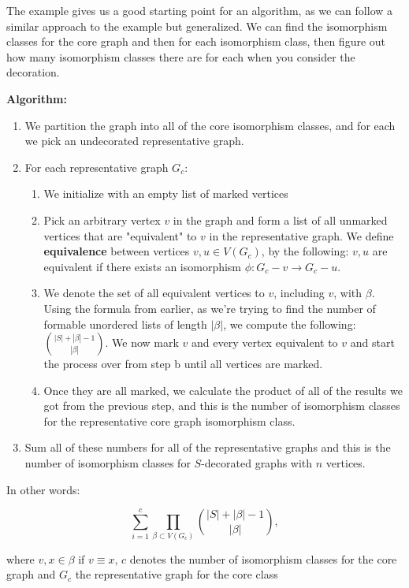\documentclass[11pt,reqno]{amsart}
\theoremstyle{definition}
\begin{document}
The example gives us a good starting point for an algorithm, as we can follow a similar approach to the example but generalized. We can find the isomorphism classes for the core graph and then for each isomorphism class, then figure out how many isomorphism classes there are for each when you consider the decoration.

\textbf{Algorithm:}
\begin{enumerate}
    \item We partition the graph into all of the core isomorphism classes, and for each we pick an undecorated representative graph.
    \item For each representative graph $G_c$:
    \begin{enumerate}
        \item We initialize with an empty list of marked vertices
        \item Pick an arbitrary vertex $v$ in the graph and form a list of all unmarked vertices that are "equivalent" to $v$ in the representative graph. We define \textbf{equivalence} between vertices $v, u \in V(G_c)$, by the following: $v, u$ are equivalent if there exists an isomorphism $\phi: G_c - v \rightarrow G_c - u$. 
        \item We denote the set of all equivalent vertices to $v$, including $v$, with $\beta$. Using the formula from earlier, as we're trying to find the number of formable unordered lists of length $|\beta|$, we compute the following: $\binom{|S| + |\beta| - 1}{|\beta|}$. We now mark $v$ and every vertex equivalent to $v$ and start the process over from step b until all vertices are marked.
        \item Once they are all marked, we calculate the product of all of the results we got from the previous step, and this is the number of isomorphism classes for the representative core graph isomorphism class. 
    \end{enumerate}
    \item Sum all of these numbers for all of the representative graphs and this is the number of isomorphism classes for $S$-decorated graphs with $n$ vertices.
\end{enumerate}


In other words:

$$\sum^c_{i=1} \prod_{\beta \subset V(G_c)} \binom{|S| + |\beta| - 1}{|\beta|},$$

where $v, x \in \beta$ if $v \equiv x$, $c$ denotes the number of isomorphism classes for the core graph and $G_c$ the representative graph for the core class
\end{document}
